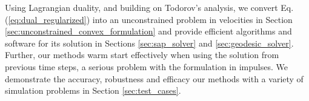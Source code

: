 Using Lagrangian duality, and building on Todorov's analysis, we convert Eq.
(\ref{eq:dual_regularized}) into an unconstrained problem in velocities in
Section \ref{sec:unconstrained_convex_formulation} and
provide efficient algorithms and software for its solution in Sections
\ref{sec:sap_solver} and \ref{sec:geodesic_solver}. Further, our methods warm
start effectively when using the solution from previous time steps, a serious
problem with the formulation in impulses. We demonstrate the accuracy,
robustness and efficacy our methods with a variety of simulation problems in
Section \ref{sec:test_cases}.
